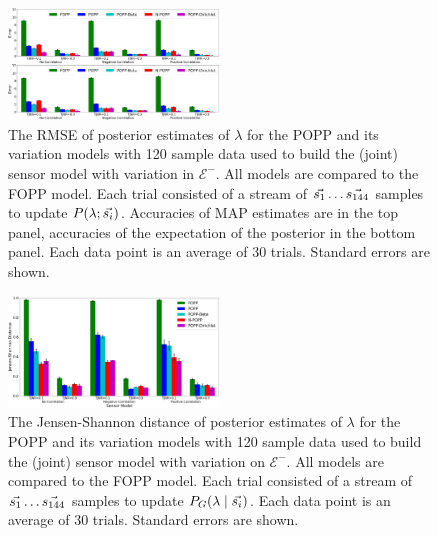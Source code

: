 \begin{figure}[t!]
	\centering
	\includegraphics[width=0.5\textwidth]{./figures/tjnr_comparison_120.png}
    \caption{The RMSE of posterior estimates of $\lambda$ for the POPP and its variation models with 120 sample data used to build the (joint) sensor model with variation in $\mathcal{E^-}$. All models are compared to the FOPP model. Each trial consisted of a stream of $\protect\vec{s_1} \ldots \protect\vec{s_{144}}$ samples to update $P(\lambda ; \protect\vec{s_i})$. Accuracies of MAP estimates are  in the top panel, accuracies of the expectation of the posterior in the bottom panel. Each data point is an average of 30 trials. Standard errors are shown.} 
	\label{fig:tjnr_comparison_120}
\end{figure}

\begin{figure}[t!]
	\centering
	\includegraphics[width=0.5\textwidth]{./figures/tjnr_comparison_120_kl.png}
	\caption{The Jensen-Shannon distance of posterior estimates of $\lambda$ for the POPP and its variation models with 120 sample data used to build the (joint) sensor model with variation on $\mathcal{E^-}$. All models are compared to the FOPP model. Each trial consisted of a stream of $\protect\vec{s_1} \ldots \protect\vec{s_{144}}$ samples to update $P_G(\lambda \mid \protect\vec{s_i})$. Each data point is an average of 30 trials. Standard errors are shown.} 
	\label{fig:tjnr_comparison_120_kl}
\end{figure}

